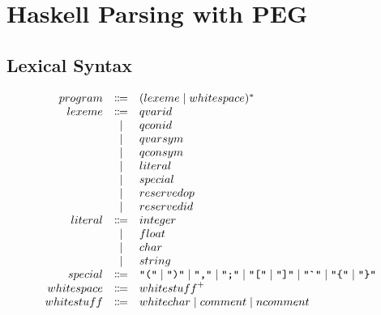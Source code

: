 \section{Haskell Parsing with PEG}

\cite{SimonMarlow:2010}

\subsection{Lexical Syntax}

\begin{align*}
  \begin{array}{rcl}
    {program}
    & \Coloneq & ({lexeme} \mid {whitespace})^* \\
    {lexeme}
    & \Coloneq & {qvarid} \\
    & \mid & {qconid} \\
    & \mid & {qvarsym} \\
    & \mid & {qconsym} \\
    & \mid & {literal} \\
    & \mid & {special} \\
    & \mid & {reservedop} \\
    & \mid & {reservedid} \\
    {literal}
    & \Coloneq & {integer} \\
    & \mid & {float} \\
    & \mid & {char} \\
    & \mid & {string} \\
    {special}
    & \Coloneq & \text{\texttt{\textquotedbl(\textquotedbl}}
    \mid \text{\texttt{\textquotedbl)\textquotedbl}}
    \mid \text{\texttt{\textquotedbl,\textquotedbl}}
    \mid \text{\texttt{\textquotedbl;\textquotedbl}}
    \mid \text{\texttt{\textquotedbl[\textquotedbl}}
    \mid \text{\texttt{\textquotedbl]\textquotedbl}}
    \mid \text{\texttt{\textquotedbl\textasciigrave\textquotedbl}}
    \mid \text{\texttt{\textquotedbl\{\textquotedbl}}
    \mid \text{\texttt{\textquotedbl\}\textquotedbl}}
    \\
    {whitespace}
    & \Coloneq & {whitestuff}^+
    \\
    {whitestuff}
    & \Coloneq & {whitechar}
    \mid {comment}
    \mid {ncomment}
  \end{array}
\end{align*}

